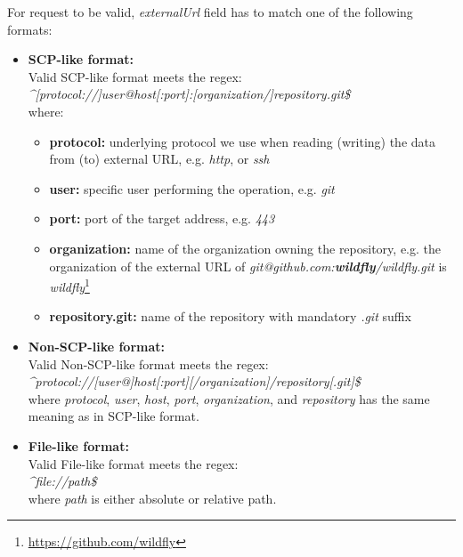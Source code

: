 \documentclass[../main.tex]{subfiles}
\begin{document}
For request to be valid, \textit{externalUrl} field has to match one of the following formats:

\begin{itemize}
    \item \textbf{SCP-like format:}\\
    Valid SCP-like format meets the regex:\\
    \textit{\textasciicircum [protocol://]user@host[:port]:[organization/]repository.git\$}\\
    where:
    \begin{itemize}
        \item \textbf{protocol:} underlying protocol we use when reading (writing) the data from (to) external URL, e.g. \textit{http}, or \textit{ssh}

        \item \textbf{user:} specific user performing the operation, e.g. \textit{git}

        \item \textbf{port:} port of the target address, e.g. \textit{443}

        \item \textbf{organization:} name of the organization owning the repository, e.g. the organization of the external URL of \textit{git@github.com:\textbf{wildfly}/wildfly.git} is \textit{wildfly}\footnote{\url{https://github.com/wildfly}}

        \item \textbf{repository.git:} name of the repository with mandatory \textit{.git} suffix
    \end{itemize}

    \item \textbf{Non-SCP-like format:}\\
    Valid Non-SCP-like format meets the regex:\\
    \textit{\textasciicircum protocol://[user@]host[:port][/organization]/repository[.git]\$}\\
    where \textit{protocol}, \textit{user}, \textit{host}, \textit{port}, \textit{organization}, and \textit{repository} has the same meaning as in SCP-like format.

    \item \textbf{File-like format:}\\
    Valid File-like format meets the regex:\\ \textit{\textasciicircum file://path\$}\\
    where \textit{path} is either absolute or relative path.
\end{itemize}
\end{document}
